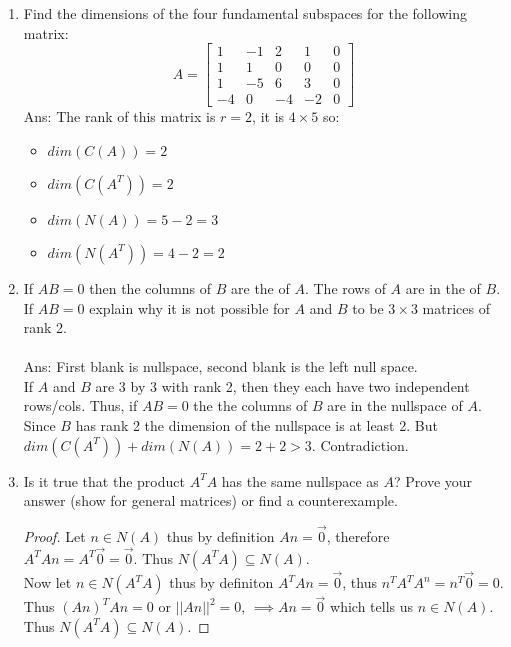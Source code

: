 \documentclass[10pt, a4paper]{article}
\theoremstyle{break}
\begin{document}
\begin{enumerate}
\item  Find the dimensions of the four fundamental subspaces for the following matrix:
\begin{equation}
A=
\begin{bmatrix}
1 & -1 & 2 &1 & 0 \\
1 & 1 & 0 & 0 & 0\\
1 & -5 & 6 & 3 & 0\\
-4 & 0 &-4 & -2 & 0
\end{bmatrix}
\end{equation}
Ans: The rank of this matrix is $r=2$, it is $4 \times 5$ so:
\begin{itemize}
\item $dim(C(A))=2$
\item $dim(C(A^T))=2$
\item $dim(N(A))=5-2=3$
\item $dim(N(A^T))=4-2=2$
\end{itemize}







\item If $AB=0$ then the columns of $B$ are the \underline{\hspace{1cm}} of $A$. The rows of $A$ are in the  \underline{\hspace{1cm}} of $B$. If $AB=0$ explain why it is not possible for $A$ and $B$ to be $3 \times 3$ matrices of rank 2. \\ \\
Ans: First blank is nullspace, second blank is the left null space. \\
If $A$ and $B$ are 3 by 3 with rank 2, then they each have two independent rows/cols. Thus, if $AB=0$ the the columns of $B$ are in the nullspace of $A$. Since $B$ has rank 2 the dimension of the nullspace is at least 2. But $dim(C(A^T))+dim(N(A))=2+2>3$. Contradiction. 







\item Is it true that the product $A^TA$ has the same nullspace as $A$? Prove your answer (show for general matrices) or find a counterexample. \\
\begin{proof}
Let $n \in N(A)$ thus by definition $An=\vec{0}$, therefore $A^TAn=A^T\vec{0}=\vec{0}.$ Thus $N(A^TA) \subseteq N(A)$. \\
Now let $n \in N(A^TA)$ thus by definiton $A^TAn=\vec{0}$, thus $n^TA^TA^n=n^T\vec{0}=0$. Thus $(An)^T An=0$ or $||An||^2=0$, $\implies An=\vec{0}$ which tells us $n \in N(A)$. Thus $N(A^TA) \subseteq N(A)$. 


\end{proof}
\end{enumerate}
\end{document}

